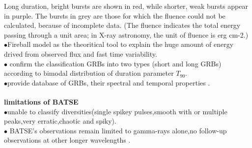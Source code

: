 Long duration, bright bursts are shown in red, while shorter, weak bursts appear in purple. The bursts in grey are those for which the fluence could not be calculated, because of incomplete data. (The fluence indicates the total energy passing through a unit area; in X-ray astronomy, the unit of fluence is erg cm-2.)\\
$\bullet$Fireball model as the theoritical tool to explain the huge amount of energy   drived from observed flux and fast time variability.\\
$\bullet$ confirm  the classification GRBs into two types (short and long GRBs) according to  bimodal distribution of duration parameter $ T_{90} $.\\
$\bullet$provide database of GRBs, their spectral and temporal properties \citep{5}\citep{7}.\\\\
\textbf{limitations of BATSE}\\
$\bullet$unable to classify  diversities(single spikey pulses,smooth with or multiple peaks,very erratic,chaotic and spiky).\\ 
$\bullet$ BATSE’s observations remain limited to gamma-rays alone,no follow-up observations at other longer wavelengths \citep{5}\citep{6} \citep{7}.
